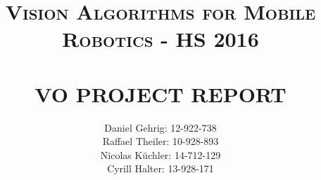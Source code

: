 \documentclass[12pt]{report}
\begin{document}
\title{ \normalsize \textsc{Vision Algorithms for Mobile Robotics - HS 2016}
\\ [2.0cm]
\HRule{0.5pt} \\
\LARGE \textbf{\uppercase{VO Project Report}}
\HRule{2pt} \\ [0.5cm]
}

\author{
Daniel Gehrig: 12-922-738 \\
Raffael Theiler: 10-928-893 \\
Nicolas Küchler: 14-712-129 \\
Cyrill Halter: 13-928-171 }
\date{}

\maketitle
\tableofcontents
\newpage

\sectionfont{\scshape}
\titlespacing*{\chapter}{0pt}{-20pt}{30pt}

%

\def \criticalKpBA {50\,}
\def \trackerMaxBidirectionalErrorBA {2.1\,}
\def \ransacNumIterationsBA {2000\,}
\def \baEveryNthFrame {4\,} 
\def \baReplace {6\,}

\def \harrisPatchSize {9\,}
\def \harrisKappa {0.08\,}
\def \numKeypoints {800\,}
\def \nonmaximumSupressionRadius {10\,}
\def \descriptorRadius {13\,}
\def \matchLambda {8\,}
\def \triangulationAngleThreshold {3\,}
\def \candidateCap {500\,}
\def \addCandidateEachFrame {100\,}
\def \triangulationMaxReprError {20\,}
\def \criticalKp {0\,}
\def \trackerMaxBidirectionalError {infinity\,}
\def \trackerBlocksize {13\,}
\def \ransacNumIterations {500\,}
\def \ransacPixelTolerance {10\,}

\newcommand{\coderef}[1]{[$\square$\kern-0.78em{$\equiv$}\:#1]\:}






\end{document}

